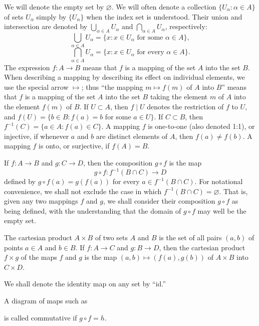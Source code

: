 We will denote the empty set by $\varnothing$. We will often denote a collection $\{U_\alpha : \alpha\in A\}$ of sets
$U_\alpha$ simply by $\{U_\alpha\}$ when the index set is understood. Their
union and intersection are denoted by $\bigcup_{\alpha\in A}U_\alpha$ and
$\bigcap_{\alpha\in A}U_\alpha$, respectively:
\[
	\bigcup_{\alpha\in A}U_\alpha=\{x:x\in U_\alpha\text{ for some }\alpha\in A\},
\]
\[
	\bigcap_{\alpha\in A}U_\alpha=\{x:x\in U_\alpha\text{ for every }\alpha\in A\}.
\]
The expression $f\colon A\to B$ means that $f$ is a mapping of the set $A$ into
the set $B$. When describing a mapping by describing its effect on individual
elements, we use the special arrow $\mapsto$; thus “the mapping
$m\mapsto f(m)$ of $A$ into $B$” means that $f$ is a mapping of the set $A$ into
the set $B$ taking the element $m$ of $A$ into the element $f(m)$ of $B$.
If $U\subset A$, then $f\mid U$ denotes the restriction of $f$ to $U$, and
$f(U)=\{b\in B: f(a)=b$ for some $a\in U\}$. If $C\subset B$, then
$f^{-1}(C)=\{a\in A: f(a)\in C\}$. A mapping $f$ is one-to-one (also denoted 1:1),
or injective, if whenever $a$ and $b$ are distinct elements of $A$, then $f(a)\neq f(b)$.
A mapping $f$ is onto, or surjective, if $f(A)=B$. 

If $f\colon A \to B$ and $g\colon C \to D$, then the composition $g\circ f$ is the map
\[
	g\circ f\colon f^{-1}(B\cap C)\to D
\]
defined by $g \circ f(a) = g(f(a))$ for every $a \in f^{-1}(B \cap C)$.
For notational convenience, we shall not exclude the case in which
$f^{-1}(B \cap C) = \varnothing$. That is, given any two mappings $f$
and $g$, we shall consider their composition $g \circ f$ as being defined,
with the understanding that the domain of $g \circ f$ may well be the
empty set. 

The cartesian product  $ A \times B $ of two sets  $ A $ and  $ B $ is the
set of all pairs  $ (a, b) $ of points  $ a \in A $ and  $ b \in B $.
If  $ f: A \to C $ and  $ g: B \to D $, then the cartesian product
$ f \times g $ of the maps  $ f $ and  $ g $ is the map
$ (a, b) \mapsto (f(a), g(b)) $ of  $ A \times B $ into  $ C \times D $.

We shall denote the identity map on any set by “id.” 

A diagram of maps such as
\begin{center}
\end{center}
is called commutative if  $ g \circ f = h $. 

